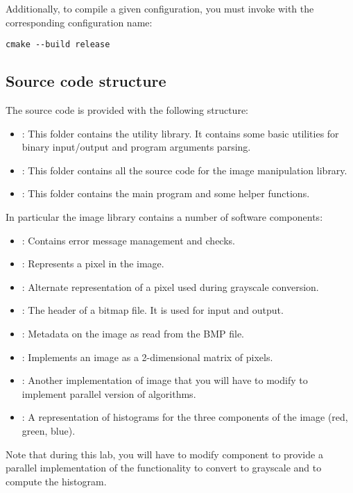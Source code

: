 Additionally, to compile a given configuration, you must invoke 
with the corresponding configuration name:

\begin{lstlisting}[style=terminal,aboveskip=1em,belowskip=1em]
cmake --build release
\end{lstlisting}


\subsection{Source code structure}

The source code is provided with the following structure:


\begin{itemize}

\item {}: This folder contains the utility library. It contains
some basic utilities for binary input/output and program arguments parsing.

\item {}: This folder contains all the source code for the image manipulation library.

\item {}: This folder contains the main program and some helper
functions.

\end{itemize}

In particular the image library contains a number of software components:

\begin{itemize}

\item {}: Contains error message management and checks.

\item {}: Represents a pixel in the image.

\item {}: Alternate representation of a pixel used during
grayscale conversion.

\item {}: The header of a bitmap file. It is used for input
and output.

\item {}: Metadata on the image as read from the BMP file.

\item {}: Implements an image as a 2-dimensional matrix of pixels.

\item {}: Another implementation of image that you will
have to modify to implement parallel version of algorithms.

\item {}: A representation of histograms for the three components
of the image (red, green, blue).

\end{itemize}

Note that during this lab, you will have to modify component
 to provide a parallel implementation of the
functionality to convert to grayscale and to compute the histogram.
